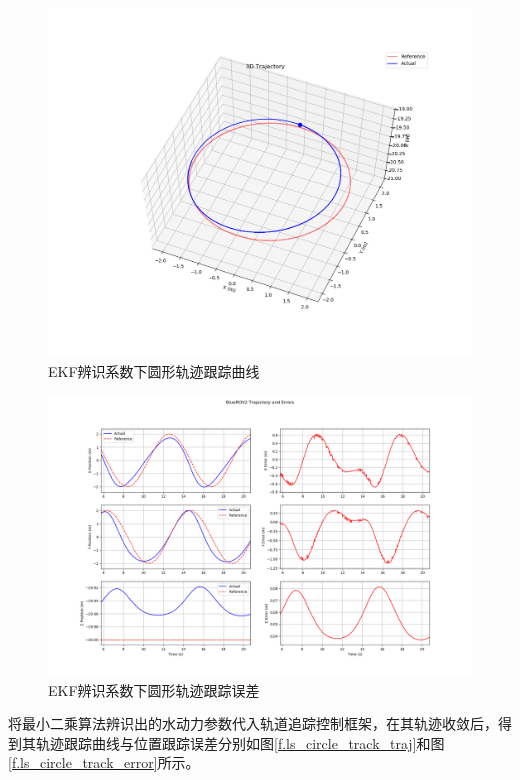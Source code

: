 \begin{figure}[hbt]
    \centering
    \includegraphics[width=0.8\linewidth]{images/chapter4/circle_track_traj.png}
    \caption{EKF辨识系数下圆形轨迹跟踪曲线}
    \label{f.circle_track_traj}
\end{figure}
\begin{figure}[hbt]
    \centering
    \includegraphics[width=0.8\linewidth]{images/chapter4/circle_traj_error.png}
    \caption{EKF辨识系数下圆形轨迹跟踪误差}
    \label{f.circle_track_error}
\end{figure}

将最小二乘算法辨识出的水动力参数代入轨道追踪控制框架，在其轨迹收敛后，得到其轨迹跟踪曲线与位置跟踪误差分别如图\ref{f.ls_circle_track_traj}和图\ref{f.ls_circle_track_error}所示。

